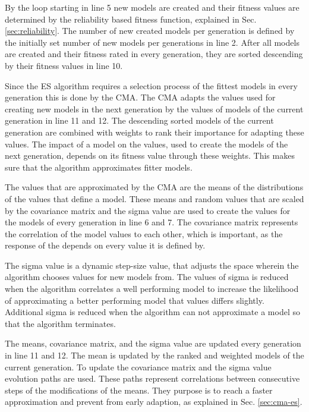 By the loop starting in line 5 new models are created and their fitness values are determined by the reliability based fitness function, explained in Sec. \ref{sec:reliability}. %
The number of new created models per generation is defined by the initially set number of new models per generations in line 2.
After all models are created and their fitness rated in every generation, they are sorted descending by their fitness values in line 10.

Since the \ac{ES} algorithm requires a selection process of the fittest models in every generation this is done by the \ac{CMA}.
The \ac{CMA} adapts the values used for creating new models in the next generation by the values of models of the current generation in line 11 and 12. %
The descending sorted models of the current generation are combined with weights to rank their importance for adapting these values.
The impact of a model on the values, used to create the models of the next generation, depends on its fitness value through these weights.
This makes sure that the algorithm approximates fitter models.

The values that are approximated by the \ac{CMA} are the means of the distributions of the values that define a model.
These means and random values that are scaled by the covariance matrix and the sigma value are used to create the values for the models of every generation in line 6 and 7. %
The covariance matrix represents the correlation of the model values to each other, which is important, as the response of the \apuf depends on every value it is defined by. %

The sigma value is a dynamic step-size value, that adjusts the space wherein the algorithm chooses values for new models from.
The values of sigma is reduced when the algorithm correlates a well performing model to increase the likelihood of approximating a better performing model that values differs slightly. %
Additional sigma is reduced when the algorithm can not approximate a model so that the algorithm terminates.

The means, covariance matrix, and the sigma value are updated every generation in line 11 and 12.
The mean is updated by the ranked and weighted models of the current generation. %
To update the covariance matrix and the sigma value evolution paths are used.
These paths represent correlations between consecutive steps of the modifications of the means. They purpose is to reach a faster approximation and prevent from early adaption, as explained in Sec. \ref{sec:cma-es}.

